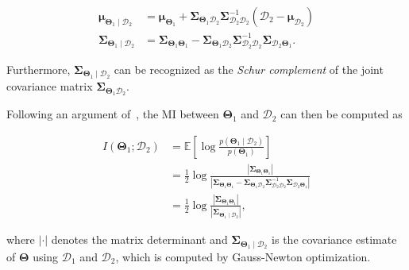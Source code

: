 \begin{equation}\label{eqn:joint_conditional}
  \begin{aligned}
  \boldsymbol{\mu}_{\boldsymbol{\Theta}_1\mid\mathcal{D}_2} &=
    \boldsymbol{\mu}_{\boldsymbol{\Theta}_1} +
    \boldsymbol{\Sigma}_{\boldsymbol{\Theta}_1\mathcal{D}_2}
    \boldsymbol{\Sigma}_{\mathcal{D}_2\mathcal{D}_2}^{-1}
    (\mathcal{D}_2 - \boldsymbol{\mu}_{\mathcal{D}_2})\\
  \boldsymbol{\Sigma}_{\boldsymbol{\Theta}_1\mid\mathcal{D}_2} &=
    \boldsymbol{\Sigma}_{\boldsymbol{\Theta}_1\boldsymbol{\Theta}_1} -
    \boldsymbol{\Sigma}_{\boldsymbol{\Theta}_1\mathcal{D}_2}
    \boldsymbol{\Sigma}_{\mathcal{D}_2\mathcal{D}_2}^{-1}
    \boldsymbol{\Sigma}_{\mathcal{D}_2\boldsymbol{\Theta}_1}.
  \end{aligned}
\end{equation}

\noindent Furthermore,
$\boldsymbol{\Sigma}_{\boldsymbol{\Theta}_1\mid\mathcal{D}_2}$ can
be recognized as the \emph{Schur complement} of the joint covariance matrix
$\boldsymbol{\Sigma}_{\boldsymbol{\Theta}_1\mathcal{D}_2}$.

Following an argument of~\cite{davison05active}, the MI between
$\mathbf{\Theta}_1$ and $\mathcal{D}_2$ can then be computed as

\begin{equation}\label{eqn:mi_normal}
  \begin{aligned}
  I(\mathbf{\Theta}_1;\mathcal{D}_2) &=
    \mathbb{E}\left[\log
    \frac{p(\mathbf{\Theta}_1\mid\mathcal{D}_2)}{p(\mathbf{\Theta}_1)}\right]\\
    &= \frac{1}{2}\log\frac{|\boldsymbol{\Sigma}_{\boldsymbol{\Theta}_1
    \boldsymbol{\Theta}_1}|}
    {|\boldsymbol{\Sigma}_{\boldsymbol{\Theta}_1\boldsymbol{\Theta}_1} -
    \boldsymbol{\Sigma}_{\boldsymbol{\Theta}_1\mathcal{D}_2}
    \boldsymbol{\Sigma}_{\mathcal{D}_2\mathcal{D}_2}^{-1}
    \boldsymbol{\Sigma}_{\mathcal{D}_2\boldsymbol{\Theta}_1}|}\\
    &= \frac{1}{2}\log\frac{|\boldsymbol{\Sigma}_{\boldsymbol{\Theta}_1
    \boldsymbol{\Theta}_1}|}
    {|\boldsymbol{\Sigma}_{\boldsymbol{\Theta}_1\mid\mathcal{D}_2}|},
  \end{aligned}
\end{equation}

\noindent where $|\cdot|$ denotes the matrix determinant and
$\boldsymbol{\Sigma}_{\boldsymbol{\Theta}_1\mid\mathcal{D}_2}$ is the covariance
estimate of $\boldsymbol{\Theta}$ using $\mathcal{D}_1$ and $\mathcal{D}_2$,
which is computed by Gauss-Newton optimization.


